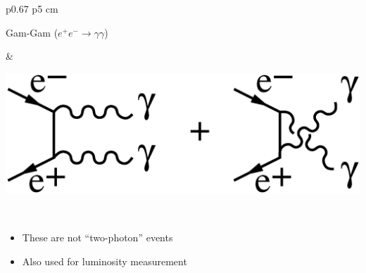 \begin{slide*}
\begin{minipage}[t]{\linewidth}


\vspace{1.5 cm}

\begin{tabular}{p{0.67\linewidth} p{5 cm}}
\begin{minipage}{\linewidth}
  Gam-Gam ($e^+e^- \to \gamma \gamma$)
\end{minipage} & \begin{minipage}{\linewidth}
  \includegraphics[height=1.5 cm]{gamgam_diagrams.eps}
\end{minipage} \\
\end{tabular}
\begin{itemize}

  \item These are not ``two-photon'' events


  \item Also used for luminosity measurement

\end{itemize}

\end{minipage}
\end{slide*}


